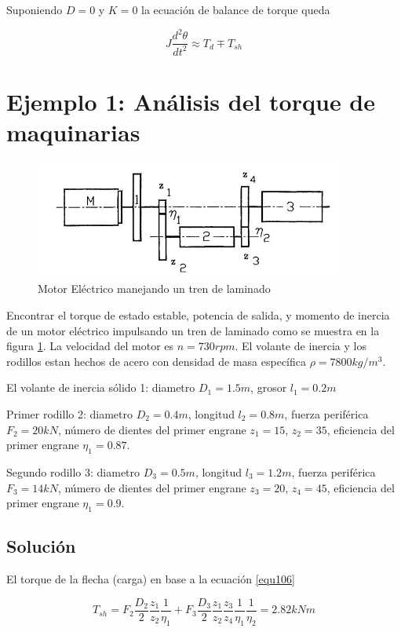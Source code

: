 \documentclass[12pt]{book}
\theoremstyle{definition}
\theoremstyle{remark}
\theoremstyle{plain}
\begin{document}
Suponiendo $D=0$ y $K=0$ la ecuación de balance de torque queda

\begin{equation}
\label{equ112}
J \frac{d ^2 \theta}{d t^2} \approx T_d \mp T_{sh}
\end{equation}

\section{Ejemplo 1: Análisis del torque de maquinarias}

\begin{figure}
\centering
\includegraphics[width=4in]{trendelaminado.jpg}
\caption{Motor Eléctrico manejando un tren de laminado}
\label{fig2}
\end{figure}

Encontrar el torque de estado estable, potencia de salida, y momento de inercia de un motor eléctrico impulsando un tren de laminado como se muestra en la figura \ref{fig2}. La velocidad del motor es $n=730 rpm$. El volante de inercia y los rodillos estan hechos de acero con densidad de masa específica $\rho = 7800 kg/m^3$.

El volante de inercia sólido 1: diametro $D_1=1.5m$, grosor $l_1=0.2 m$

Primer rodillo 2: diametro $D_2=0.4m$, longitud $l_2=0.8m$, fuerza periférica $F_2=20kN$, número de dientes del primer engrane $z_1=15$, $z_2=35$, eficiencia del primer engrane $\eta_1=0.87$.

Segundo rodillo 3: diametro $D_3=0.5m$, longitud $l_3=1.2m$, fuerza periférica $F_3=14kN$, número de dientes del primer engrane $z_3=20$, $z_4=45$, eficiencia del primer engrane $\eta_1=0.9$.

\subsection{Solución}

El torque de la flecha (carga) en base a la ecuación \ref{equ106}

\begin{equation}
\label{equ113}
T_{sh}= F_2 \frac{D_2}{2}\frac{z_1}{z_2}\frac{1}{\eta _1}+F_3\frac{D_3}{2}\frac{z_1}{z_2}\frac{z_3}{z_4}\frac{1}{\eta _1}\frac{1}{\eta _2}=2.82 kNm
\end{equation}
\end{document}
